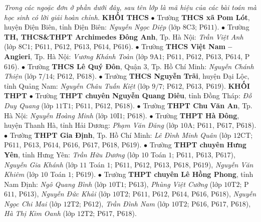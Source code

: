 \begin{multicols}{2}
	\textit{Trong các ngoặc đơn ở phần dưới đây, sau tên lớp là mã hiệu của các bài toán mà học sinh có lời giải hoàn chỉnh.}
	\vskip 0.05cm
	\textbf{\color{thachthuctoanhoc}KHỐI THCS}
	\vskip 0.05cm
	$\bullet$ Trường \textbf{\color{thachthuctoanhoc}THCS xã Pom Lót}, huyện Điện Biên, tỉnh Điện Biên: \textit{Nguyễn Ngọc Diệp} (lớp $8$C$3$; P$611$).
	\vskip 0.05cm
	$\bullet$ Trường \textbf{\color{thachthuctoanhoc}TH, THCS\&THPT Archimedes Đông Anh}, Tp. Hà Nội:  \textit{Trần Việt Anh} (lớp $8$C$1$; P$611$, P$612$, P$613$, P$614$, P$616$).
	\vskip 0.05cm
	$\bullet$ Trường \textbf{\color{thachthuctoanhoc}THCS Việt Nam -- Angieri}, Tp. Hà Nội: \textit{Vương Khánh Toàn} (lớp $9$A$1$; P$611$, P$612$, P$613$, P$614$, P$616$).
	\vskip 0.05cm
	$\bullet$ Trường \textbf{\color{thachthuctoanhoc}THCS Lê Quý Đôn}, Quận $3$, Tp. Hồ Chí Minh: \textit{Nguyễn Chánh Thiện} (lớp $7/14$; P$612$, P$618$).
	\vskip 0.05cm
	$\bullet$ Trường \textbf{\color{thachthuctoanhoc}THCS Nguyễn Trãi}, huyện Đại Lộc, tỉnh Quảng Nam: \textit{Nguyễn Châu Tuấn Kiệt} (lớp $9/7$; P$612$, P$613$, P$619$).
	\vskip 0.05cm
	\textbf{\color{thachthuctoanhoc}KHỐI THPT}
	\vskip 0.05cm
	$\bullet$ Trường \textbf{\color{thachthuctoanhoc}THPT chuyên Nguyễn Quang Diêu}, tỉnh Đồng Tháp: \textit{Đỗ Duy Quang} (lớp $11$T$1$; P$611$, P$612$, P$618$).
	\vskip 0.05cm
	$\bullet$ Trường \textbf{\color{thachthuctoanhoc}THPT Chu Văn An}, Tp. Hà Nội: \textit{Nguyễn Hoàng Minh} (lớp $10$I$1$; P$618$).
	\vskip 0.05cm
	$\bullet$ Trường \textbf{\color{thachthuctoanhoc}THPT Hà Đông}, huyện Thanh Hà, tỉnh Hải Dương: \textit{Phạm Văn Đăng} (lớp $10$A; P$611$, P$617$, P$618$).
	\vskip 0.05cm
	$\bullet$ Trường \textbf{\color{thachthuctoanhoc}THPT Gia Định}, Tp. Hồ Chí Minh: \textit{Lê Đình Minh Quân} (lớp $12$CT; P$611$, P$613$, P$614$, P$616$, P$617$, P$618$, P$619$).
	\vskip 0.05cm
	$\bullet$ Trường \textbf{\color{thachthuctoanhoc}THPT chuyên Hưng Yên}, tỉnh Hưng Yên: \textit{Trần Hữu Dương} (lớp $10$ Toán $1$; P$611$, P$613$, P$617$), \textit{Nguyễn Gia Khánh} (lớp $11$ Toán $1$; P$611$, P$612$, P$613$, P$618$, P$619$), \textit{Nguyễn Văn Khiêm} (lớp $10$ Toán $1$; P$619$).
	\vskip 0.05cm
	$\bullet$ Trường \textbf{\color{thachthuctoanhoc}THPT chuyên Lê Hồng Phong}, tỉnh Nam Định: \textit{Ngô Quang Bình} (lớp $10$T$1$; P$613$), \textit{Phùng Việt Cường} (lớp $10$T$2$; P$611$, P$613$), \textit{Nguyễn Đức Khải} (lớp $10$T$2$; P$611$, P$612$, P$614$, P$616$, P$618$), \textit{Nguyễn Ngọc Chi Mai} (lớp $12$T$2$; P$612$), \textit{Trần Đình Nam} (lớp $10$T$2$; P$616$, P$617$, P$618$), \textit{Hà Thị Kim Oanh} (lớp $12$T$2$; P$617$, P$618$).

\end{multicols}
